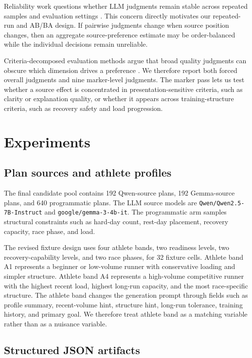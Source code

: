 \documentclass[11pt]{article}
\begin{document}
Reliability work questions whether LLM judgments remain stable across repeated samples and evaluation settings \citep{schroeder2025trustllmjudgmentsreliability}. This concern directly motivates our repeated-run and AB/BA design. If pairwise judgments change when source position changes, then an aggregate source-preference estimate may be order-balanced while the individual decisions remain unreliable.

Criteria-decomposed evaluation methods argue that broad quality judgments can obscure which dimension drives a preference \citep{liu2024hdevalaligninglargelanguage}. We therefore report both forced overall judgments and nine marker-level judgments. The marker pass lets us test whether a source effect is concentrated in presentation-sensitive criteria, such as clarity or explanation quality, or whether it appears across training-structure criteria, such as recovery safety and load progression.

\section{Experiments}

\subsection{Plan sources and athlete profiles}

The final candidate pool contains 192 Qwen-source plans, 192 Gemma-source plans, and 640 programmatic plans. The LLM source models are \texttt{Qwen/Qwen2.5-7B-Instruct} and \texttt{google/gemma-3-4b-it}. The programmatic arm samples structural constraints such as hard-day count, rest-day placement, recovery capacity, race phase, and load.

The revised fixture design uses four athlete bands, two readiness levels, two recovery-capability levels, and two race phases, for 32 fixture cells. Athlete band A1 represents a beginner or low-volume runner with conservative loading and simpler structure. Athlete band A4 represents a high-volume competitive runner with the highest recent load, highest long-run capacity, and the most race-specific structure. The athlete band changes the generation prompt through fields such as profile summary, recent-volume hint, structure hint, long-run tolerance, training history, and primary goal. We therefore treat athlete band as a matching variable rather than as a nuisance variable.

\subsection{Structured JSON artifacts}
\end{document}
